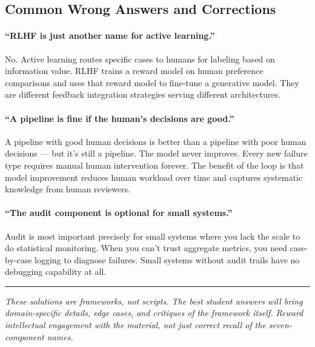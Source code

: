 \subsection{Common Wrong Answers and Corrections}

\paragraph{``RLHF is just another name for active learning.''}
No. Active learning routes specific cases to humans for labeling based on information value. RLHF trains a reward model on human preference comparisons and uses that reward model to fine-tune a generative model. They are different feedback integration strategies serving different architectures.

\paragraph{``A pipeline is fine if the human's decisions are good.''}
A pipeline with good human decisions is better than a pipeline with poor human decisions --- but it's still a pipeline. The model never improves. Every new failure type requires manual human intervention forever. The benefit of the loop is that model improvement reduces human workload over time and captures systematic knowledge from human reviewers.

\paragraph{``The audit component is optional for small systems.''}
Audit is most important precisely for small systems where you lack the scale to do statistical monitoring. When you can't trust aggregate metrics, you need case-by-case logging to diagnose failures. Small systems without audit trails have no debugging capability at all.

\bigskip
\begin{center}
\rule{0.5\textwidth}{0.4pt}
\end{center}
\bigskip

\noindent\textit{These solutions are frameworks, not scripts. The best student answers will bring domain-specific details, edge cases, and critiques of the framework itself. Reward intellectual engagement with the material, not just correct recall of the seven-component names.}
